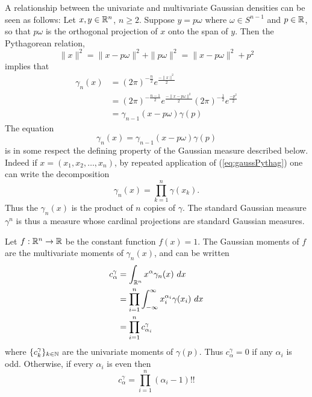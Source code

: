A relationship between the univariate and multivariate Gaussian densities can be seen as follows: Let $x, y \in \mathbb{R}^n$, $n \geq 2$. Suppose $y = p\omega$ where $\omega \in S^{n-1}$ and $p \in \mathbb{R}$, so that $p\omega$ is the orthogonal projection of $x$ onto the span of $y$. Then the Pythagorean relation,
\[
  \|x\|^2 = \|x - p\omega\|^2 + \|p\omega\|^2 = \|x - p\omega\|^2 + p^2
\]
implies that
\begin{align*}
  \gamma_n(x) 
  &= {(2\pi)}^{-\frac n2} e^{\frac{-\|x\|^2}2} \\
  &= {(2\pi)}^{-\frac{n-1}2} e^{\frac{-\|x - p\omega\|^2}2} {(2\pi)}^{-\frac12} e^{\frac{-p^2}2} \\
  &= \gamma_{n-1}(x - p\omega)\gamma(p)
\end{align*}
The equation
\begin{equation}\label{eq:gaussPythag}
  \gamma_n(x) = \gamma_{n-1}(x - p\omega)\gamma(p)
\end{equation}
is in some respect the defining property of the Gaussian measure described below. Indeed if $x = (x_1, x_2, \ldots, x_n)$, by repeated application of (\ref{eq:gaussPythag}) one can write the decomposition
\[
  \gamma_n(x) = \prod_{k = 1}^n \gamma(x_k).
\]
Thus the $\gamma_n(x)$ is the product of $n$ copies of $\gamma$. The standard Gaussian measure $\gamma^n$ is thus a measure whose cardinal projections are standard Gaussian measures.


\begin{myexample}
  Let $f:\mathbb{R}^n \rightarrow \mathbb{R}$ be the constant function $f(x) = 1$. The Gaussian moments of $f$ are the multivariate moments of $\gamma_n(x)$, and can be written
  \begin{align*}
    c^\gamma_\alpha 
    &= \int_{\mathbb{R}^n} x^\alpha \gamma_n(x) ~dx \\
    &= \prod_{i = 1}^n \int_{-\infty}^\infty x_i^{\alpha_i} \gamma(x_i) ~dx \\
    &= \prod_{i = 1}^n c^\gamma_{\alpha_i}
  \end{align*}
  where $\{c^\gamma_k\}_{k \in \mathbb{N}}$ are the univariate moments of $\gamma(p)$.
  Thus $c^\gamma_\alpha = 0$ if any $\alpha_i$ is odd. Otherwise, if every $\alpha_i$ is even then
  \[
    c^\gamma_\alpha = \prod_{i = 1}^n (\alpha_i - 1)!!
  \]
\end{myexample}

